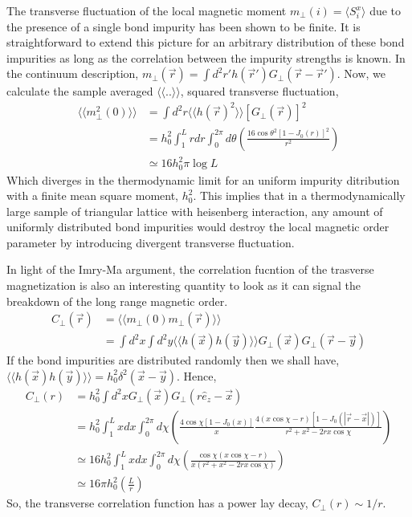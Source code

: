 \documentclass{article}
\newcommand{\vx}{\vec{x}}
\newcommand{\vy}{\vec{y}}
\newcommand{\vr}{\vec{r}}
\newcommand{\ue}{\hat{e}}
\begin{document}
The transverse fluctuation of the local magnetic moment 
$m_\perp(i)=\langle S^x_i\rangle$ due to the presence of a 
single bond impurity has been shown to be finite. It is 
straightforward to extend this picture for an arbitrary
distribution of these bond impurities as long as the 
correlation between the impurity strengths is known. 
In the continuum  description, $m_\perp(\vr) = \int 
d^2r' h(\vr')G_\perp(\vr-\vr')$. Now, we calculate the 
sample averaged $\langle\langle .. \rangle\rangle$, 
squared transverse fluctuation,
\begin{equation}
    \begin{aligned}
        \langle\langle m^2_\perp(0)
        \rangle\rangle
        &=\int d^2r\langle\langle h(\vr)^2
        \rangle\rangle
        \left[G_\perp(\vr)\right]^2 \\
        &=h_0^2\int^{L}_{1} rdr
        \int^{2\pi}_0d\theta
        \left(\frac{16\cos\theta^2
            [1-J_0(r)]^2}
        {r^2}\right) \\
        &\simeq 16h_0^2\pi\log L
    \end{aligned}
\end{equation}
Which diverges in the thermodynamic limit for an uniform 
impurity ditribution with a finite mean square moment, 
$h_0^2$. This implies that in a thermodynamically 
large sample of triangular lattice with heisenberg 
interaction, any amount of uniformly distributed bond 
impurities would destroy the local magnetic order parameter 
by introducing divergent transverse fluctuation.

In light of the Imry-Ma argument, the correlation fucntion 
of the trasverse magnetization is also an interesting
quantity to look as it can signal the breakdown of the 
long range magnetic order.
\begin{equation}
    \begin{aligned}
        C_\perp(\vr)&=\langle\langle
        m_\perp(0)m_\perp(\vr)\rangle\rangle \\
        &=\int d^2x\int d^2y
        \langle\langle h(\vx)h(\vy)
        \rangle\rangle
        G_\perp(\vx)G_\perp(\vr-\vy)
    \end{aligned}
\end{equation}
If the bond impurities are distributed randomly then we 
shall have, $\langle\langle h(\vx)h(\vy) \rangle\rangle
=h_0^2\delta^2(\vx-\vy)$. Hence,
\begin{equation}
    \begin{aligned}
        C_\perp(r) &=h_0^2\int d^2x
        G_\perp(\vx)G_\perp(r\ue_z-\vx) \\ 
        &= h_0^2\int^L_1 xdx\int^{2\pi}_0 d\chi
        \left(\frac{4\cos\chi[1-J_0(x)]}
        {x}\frac{4(x\cos\chi-r)[1-J_0(|\vr-\vx|)]}
    {r^2+x^2-2rx\cos\chi}\right) \\
        &\simeq 16h_0^2\int^L_1 xdx
        \int^{2\pi}_0d\chi
        \left(
            \frac{\cos\chi(x\cos\chi-r)}
            {x(r^2+x^2-2rx\cos\chi)}
        \right) \\
        &\simeq16\pi h^2_0\left(\frac{L}{r}\right)
    \end{aligned}
\end{equation}
So, the transverse correlation function has a power lay 
decay, $C_\perp(r)\sim1/r$.
\end{document}
